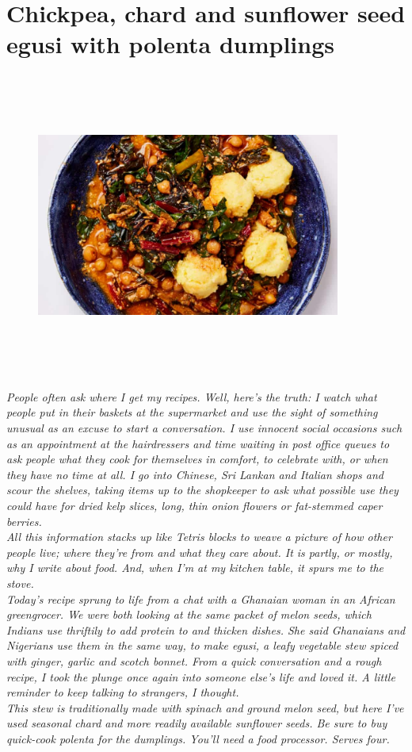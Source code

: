 \documentclass{book}
\begin{document}
\section{Chickpea, chard and sunflower seed egusi with polenta dumplings}
\begin{figure}
\centering\includegraphics[width=10cm,height=10cm,keepaspectratio]{Recipe_Pictures/Chickpea,_chard_and_sunflower_seed_egusi_with_polenta_dumplings.png}
\end{figure}
\emph{People often ask where I get my recipes. Well, here’s the truth: I watch what people put in their baskets at the supermarket and use the sight of something unusual as an excuse to start a conversation. I use innocent social occasions such as an appointment at the hairdressers and time waiting in post office queues to ask people what they cook for themselves in comfort, to celebrate with, or when they have no time at all. I go into Chinese, Sri Lankan and Italian shops and scour the shelves, taking items up to the shopkeeper to ask what possible use they could have for dried kelp slices, long, thin onion flowers or fat-stemmed caper berries.\\ 
All this information stacks up like Tetris blocks to weave a picture of how other people live; where they’re from and what they care about. It is partly, or mostly, why I write about food. And, when I’m at my kitchen table, it spurs me to the stove.\\ 
Today’s recipe sprung to life from a chat with a Ghanaian woman in an African greengrocer. We were both looking at the same packet of melon seeds, which Indians use thriftily to add protein to and thicken dishes. She said Ghanaians and Nigerians use them in the same way, to make egusi, a leafy vegetable stew spiced with ginger, garlic and scotch bonnet. From a quick conversation and a rough recipe, I took the plunge once again into someone else’s life and loved it. A little reminder to keep talking to strangers, I thought.\\ 
This stew is traditionally made with spinach and ground melon seed, but here I’ve used seasonal chard and more readily available sunflower seeds. Be sure to buy quick-cook polenta for the dumplings. You’ll need a food processor. Serves four.}\\\\ 
\end{document}
